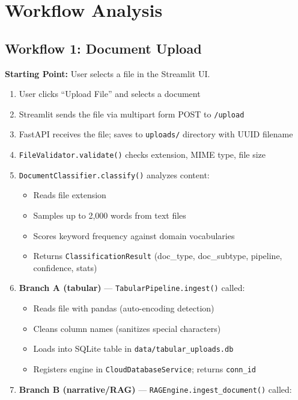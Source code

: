 \documentclass[12pt, a4paper, oneside]{report}
\newcommand{\kw}[1]{\texttt{\small #1}}
\begin{document}
\chapter{Workflow Analysis}

\section{Workflow 1: Document Upload}

\textbf{Starting Point:} User selects a file in the Streamlit UI.

\begin{enumerate}
  \item User clicks ``Upload File'' and selects a document
  \item Streamlit sends the file via multipart form POST to \kw{/upload}
  \item FastAPI receives the file; saves to \kw{uploads/} directory with UUID filename
  \item \kw{FileValidator.validate()} checks extension, MIME type, file size
  \item \kw{DocumentClassifier.classify()} analyzes content:
        \begin{itemize}
          \item Reads file extension
          \item Samples up to 2,000 words from text files
          \item Scores keyword frequency against domain vocabularies
          \item Returns \kw{ClassificationResult} (doc\_type, doc\_subtype, pipeline, confidence, stats)
        \end{itemize}
  \item \textbf{Branch A (tabular)} — \kw{TabularPipeline.ingest()} called:
        \begin{itemize}
          \item Reads file with pandas (auto-encoding detection)
          \item Cleans column names (sanitizes special characters)
          \item Loads into SQLite table in \kw{data/tabular\_uploads.db}
          \item Registers engine in \kw{CloudDatabaseService}; returns \kw{conn\_id}
        \end{itemize}
  \item \textbf{Branch B (narrative/RAG)} — \kw{RAGEngine.ingest\_document()} called:
        \begin{itemize}

\end{itemize}
\end{enumerate}
\end{document}

